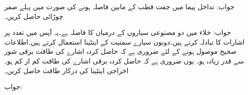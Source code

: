 جواب: 
تداخل پیما میں  جفت قطب کے مابین فاصلہ  ہونے کی صورت میں پہلے صفر چوڑائی حاصل کریں۔

جواب: 
خلاء میں دو مصنوعی سیاروں  کے درمیان  کا فاصلہ ہے۔یہ آپس میں  تعدد پر اشارات کا تبادلہ  کرتے ہیں۔دونوں سیارے  سمتیت  کے اینٹینا استعمال کرتے ہیں۔اطلاعات صحیح موصول ہونے کے لئے ضروری ہے کہ حاصل کردہ اشارے کی طاقت  برقی شور سے قدر زیادہ ہو۔ یوں ضروری ہے کہ حاصل کردہ برقی اشارے کی طاقت کم از کم  ہو۔ اخراجی اینٹینا کی درکار طاقت حاصل کریں۔

جواب:
